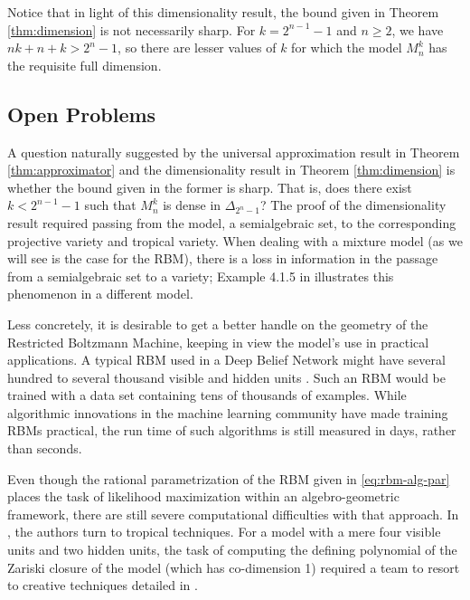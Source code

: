 \documentclass[11pt,titlepage]{article}
\numberwithin{equation}{section}
\begin{document}
    Notice that in light of this dimensionality result, the bound given in
    Theorem \ref{thm:dimension} is not necessarily sharp.  For $k = 2^{n-1}-1$
    and $n \ge 2$, we have $nk+n+k > 2^n-1$, so there are lesser values of $k$
    for which the model $M_n^k$ has the requisite full dimension.

\subsection{Open Problems}

    A question naturally suggested by the universal approximation result in
    Theorem \ref{thm:approximator} and the dimensionality result in Theorem
    \ref{thm:dimension} is whether the bound given in the former is sharp.  That
    is, does there exist $k < 2^{n-1}-1$ such that $M_n^k$ is dense in
    $\Delta_{2^n-1}$?  The proof of the dimensionality result required passing
    from the model, a semialgebraic set, to the corresponding projective variety
    and tropical variety.  When dealing with a mixture model (as we will see is
    the case for the RBM), there is a loss in information in the passage from a
    semialgebraic set to a variety; Example 4.1.5 in \cite{DSS08} illustrates
    this phenomenon in a different model.

    Less concretely, it is desirable to get a better handle on the geometry of
    the Restricted Boltzmann Machine, keeping in view the model's use in
    practical applications.  A typical RBM used in a Deep Belief Network might
    have several hundred to several thousand visible and hidden units
    \cite{Hin07}.  Such an RBM would be trained with a data set containing tens
    of thousands of examples.  While algorithmic innovations in the machine
    learning community have made training RBMs practical, the run time of such
    algorithms is still measured in days, rather than seconds.
    
    Even though the rational parametrization of the RBM given in
    \eqref{eq:rbm-alg-par} places the task of likelihood maximization within an
    algebro-geometric framework, there are still severe computational
    difficulties with that approach.  In \cite{CMS09}, the authors turn to
    tropical techniques.  For a model with a mere four visible units and two
    hidden units, the task of computing the defining polynomial of the Zariski
    closure of the model (which has co-dimension 1) required a team to resort
    to creative techniques detailed in \cite{CTY10}.  
\end{document}
